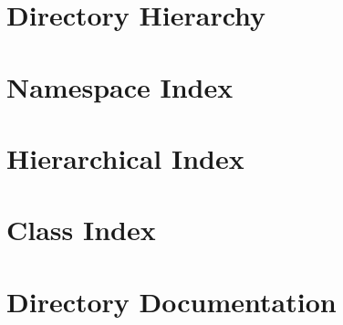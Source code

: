 \documentclass[twoside]{book}
\newcommand{\+}{\discretionary{\mbox{\scriptsize$\hookleftarrow$}}{}{}}
\begin{document}
\chapter{Directory Hierarchy}

\chapter{Namespace Index}

\chapter{Hierarchical Index}

\chapter{Class Index}

\chapter{Directory Documentation}




































\end{document}
